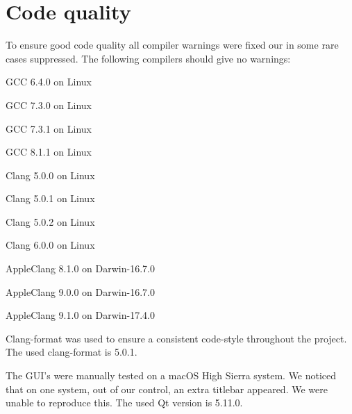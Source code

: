 \chapter{Code quality}
\label{chap:code-quality}

To ensure good code quality all compiler warnings were fixed our in some rare cases suppressed. The following compilers should give no warnings:
\begin{compactitem}
    \item GCC 6.4.0 on Linux
    \item GCC 7.3.0 on Linux
    \item GCC 7.3.1 on Linux
    \item GCC 8.1.1 on Linux
    \item Clang 5.0.0 on Linux
    \item Clang 5.0.1 on Linux
    \item Clang 5.0.2 on Linux
    \item Clang 6.0.0 on Linux
    \item AppleClang 8.1.0 on Darwin-16.7.0
    \item AppleClang 9.0.0 on Darwin-16.7.0
    \item AppleClang 9.1.0 on Darwin-17.4.0
\end{compactitem}

Clang-format was used to ensure a consistent code-style throughout the project. The used clang-format is 5.0.1.

The GUI's were manually tested on a macOS High Sierra system. We noticed that on one system, out of our control, an extra titlebar appeared. We were unable to reproduce this.
The used Qt version is 5.11.0.
